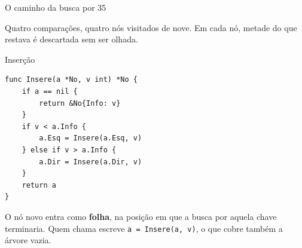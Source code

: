 \documentclass{beamer}
\begin{document}
\begin{frame}{O caminho da busca por 35}
  \begin{center}
  \end{center}

  \vspace{0.2cm}
  Quatro comparações, quatro nós visitados de nove. Em cada nó, metade do que
  restava é descartada sem ser olhada.
\end{frame}

\begin{frame}[fragile]{Inserção}
\begin{verbatim}
func Insere(a *No, v int) *No {
	if a == nil {
		return &No{Info: v}
	}
	if v < a.Info {
		a.Esq = Insere(a.Esq, v)
	} else if v > a.Info {
		a.Dir = Insere(a.Dir, v)
	}
	return a
}
\end{verbatim}

  \vspace{0.2cm}
  O nó novo entra como \textbf{folha}, na posição em que a busca por aquela
  chave terminaria. Quem chama escreve \texttt{a = Insere(a, v)}, o que cobre
  também a árvore vazia.
\end{frame}
\end{document}

